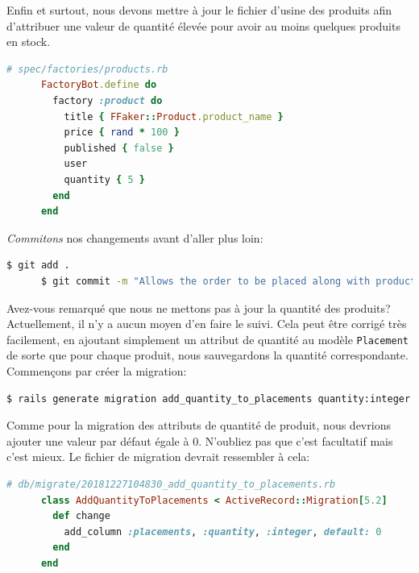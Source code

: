 \documentclass[]{report}
\begin{document}
    Enfin et surtout, nous devons mettre à jour le fichier d'usine des produits afin d'attribuer une valeur de quantité élevée pour avoir au moins quelques produits en stock.

    \begin{scriptsize}
      \begin{lstlisting}[language=ruby]
      # spec/factories/products.rb
      FactoryBot.define do
        factory :product do
          title { FFaker::Product.product_name }
          price { rand * 100 }
          published { false }
          user
          quantity { 5 }
        end
      end
      \end{lstlisting}
    \end{scriptsize}

    \textit{Commitons} nos changements avant d'aller plus loin:

    \begin{scriptsize}
      \begin{lstlisting}[language=bash]
      $ git add .
      $ git commit -m "Allows the order to be placed along with product quantity"
      \end{lstlisting}
    \end{scriptsize}

    Avez-vous remarqué que nous ne mettons pas à jour la quantité des produits? Actuellement, il n'y a aucun moyen d'en faire le suivi. Cela peut être corrigé très facilement, en ajoutant simplement un attribut de quantité au modèle \verb|Placement| de sorte que pour chaque produit, nous sauvegardons la quantité correspondante. Commençons par créer la migration:

    \begin{scriptsize}
      \begin{lstlisting}[language=bash]
      $ rails generate migration add_quantity_to_placements quantity:integer
      \end{lstlisting}
    \end{scriptsize}

    Comme pour la migration des attributs de quantité de produit, nous devrions ajouter une valeur par défaut égale à 0. N'oubliez pas que c'est facultatif mais c'est mieux. Le fichier de migration devrait ressembler à cela:

    \begin{scriptsize}
      \begin{lstlisting}[language=ruby]
      # db/migrate/20181227104830_add_quantity_to_placements.rb
      class AddQuantityToPlacements < ActiveRecord::Migration[5.2]
        def change
          add_column :placements, :quantity, :integer, default: 0
        end
      end
      \end{lstlisting}
    \end{scriptsize}
\end{document}
